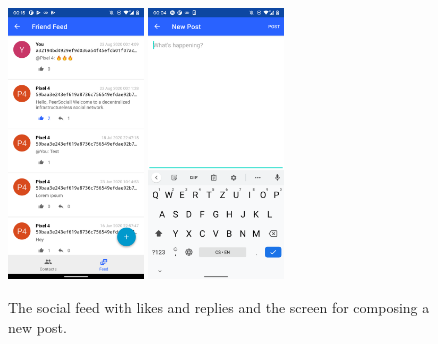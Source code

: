 \begin{figure}
    \centering
    \includegraphics[width=0.32\textwidth]{screens/superapp/feed}
    \includegraphics[width=0.32\textwidth]{screens/superapp/new_post}
    \caption{The social feed with likes and replies and the screen for composing a new post.}
    \label{peersocial_feed}
\end{figure}







